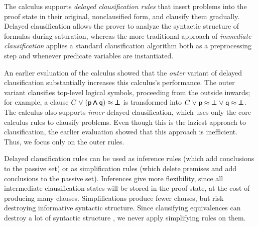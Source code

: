 \documentclass[smallcondensed,draft]{svjour3}     %
\begin{document}
The \osup{} calculus supports \emph{delayed clausification rules}
that insert problems into the proof state in their original,
nonclausified form, and clausify them gradually. 
Delayed clausification
allows the prover to analyze the syntactic structure of formulas during saturation,
whereas the more traditional approach of \emph{immediate clausification}
applies a standard clausification algorithm \cite{nw-01-small-cnf}
both as a preprocessing step and whenever predicate variables are instantiated.

An earlier evaluation of the \osup{} calculus \cite{bbtv-21-full-ho-sup} showed
that the \emph{outer} variant of delayed clausification substantially increases this calculus's performance.
The outer variant clausifies
top-level logical symbols, proceeding from the outside inwards;
for example, a clause $C \mathrel\lor (\mathsf{p} \pmb\land \mathsf{q}) \approx \pmb\bot$ is transformed into $C \mathrel\lor
\mathsf{p} \approx \pmb\bot \mathrel\lor \mathsf{q} \approx \pmb\bot$. The calculus also supports \emph{inner} delayed
clausification, which uses only the core calculus rules to clausify problems.
Even though this is the laziest approach to clausification, the earlier
evaluation showed that this approach is inefficient. Thus, we focus only on the
outer rules.

Delayed clausification rules can be used as inference rules (which add conclusions
to the passive set) or as simplification rules (which delete premises and add
conclusions to the passive set).
%
Inferences give more flexibility, since all
intermediate clausification states will be stored in the proof state, at the
cost of producing many clauses. Simplifications produce fewer clauses,
but risk destroying informative syntactic structure.
Since clausifying equivalences can destroy a lot of syntactic structure
\cite{gs-05-boolsup}, we never apply simplifying rules
on them.
\end{document}
